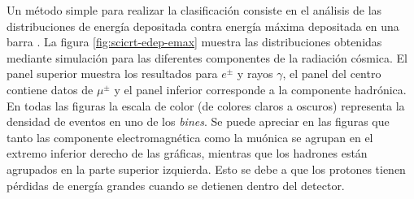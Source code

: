 Un método simple para realizar la clasificación consiste en el análisis de las distribuciones de energía depositada contra energía máxima depositada en una barra \cite{nagaiphd,eortiz19}. La figura \ref{fig:scicrt-edep-emax} muestra las distribuciones obtenidas mediante simulación para las diferentes componentes de la radiación cósmica. El panel superior muestra los resultados para $e^{\pm}$ y rayos $\gamma$, el panel del centro contiene datos de $\mu^{\pm}$ y el panel inferior corresponde a la componente hadrónica. En todas las figuras la escala de color (de colores claros a oscuros) representa la densidad de eventos en uno de los \emph{bines}. Se puede apreciar en las figuras que tanto las componente electromagnética como la muónica se agrupan en el extremo inferior derecho de las gráficas, mientras que los hadrones están agrupados en la parte superior izquierda. Esto se debe a que los protones tienen pérdidas de energía grandes cuando se detienen dentro del detector.

